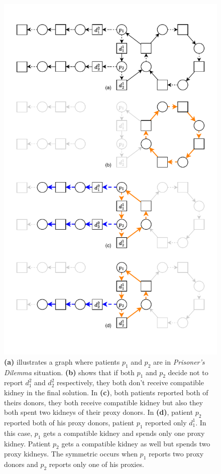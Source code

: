 \begin{figure}
    \centering
    \includegraphics{data/prisoners_dilemma.pdf}
    \caption[Prisoner's dilemma in multiple-donors model]{\textbf{(a)} illustrates a graph where patients $p_1$ and $p_2$ are in \textit{Prisoner's Dilemma} situation. \textbf{(b)} shows that if both $p_1$ and $p_2$ decide not to report $d_1^2$ and $d_2^2$ respectively, they both don't receive compatible kidney in the final solution. In \textbf{(c)}, both patients reported both of theirs donors, they both receive compatible kidney but also they both spent two kidneys of their proxy donors. In \textbf{(d)}, patient $p_2$ reported both of his proxy donors, patient $p_1$ reported only $d_1^1$. In this case, $p_1$ gets a compatible kidney and spends only one proxy kidney. Patient $p_2$ gets a compatible kidney as well but spends two proxy kidneys. The symmetric occurs when $p_1$ reports two proxy donors and $p_2$ reports only one of his proxies.}
    \label{fig:prisoners_dilemma}
\end{figure}


